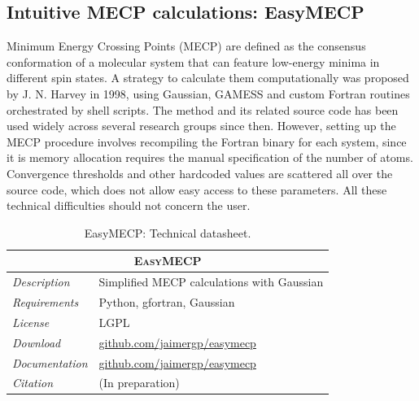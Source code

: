 \subsection{Intuitive MECP calculations: EasyMECP}

Minimum Energy Crossing Points (MECP) are defined as the consensus conformation of a molecular system that can feature low-energy minima in different spin states. A  strategy to calculate them computationally was proposed by J. N. Harvey in 1998,\cite{harvey1998} using Gaussian, GAMESS and custom Fortran routines orchestrated by shell scripts. The method and its related source code has been used widely across several research groups since then. However, setting up the MECP procedure involves recompiling the Fortran binary for each system, since it is memory allocation requires the manual specification of the number of atoms. Convergence thresholds and other hardcoded values are scattered all over the source code, which does not allow easy access to these parameters. All these technical difficulties should not concern the user.


\begin{table}[hbtp]
	\caption[EasyMECP: Technical datasheet]{EasyMECP: Technical datasheet.}
	\footnotesize
	\newcommand{\tableheading}[1]{\multicolumn{2}{c}{\textsc{#1}}}
	\begin{tabularx}{\textwidth}{RL}
		\toprule
		\tableheading{EasyMECP}\\
		\toprule
		\textit{Description} & Simplified MECP calculations with Gaussian \\
		\midrule
		\textit{Requirements} & Python, gfortran, Gaussian \\
		\midrule
		\textit{License} & LGPL \\
		\midrule
		\textit{Download} & \href{https://github.com/jaimergp/easymecp}{github.com/jaimergp/easymecp} \\
		\midrule
		\textit{Documentation} & \href{https://github.com/jaimergp/easymecp}{github.com/jaimergp/easymecp} \\
		\midrule
		\textit{Citation} & (In preparation) \\
		\bottomrule

	\end{tabularx}
\end{table}

